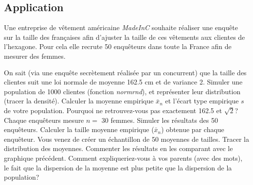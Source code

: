 \documentclass[12pt,paper=a4,answers]{exam}
\begin{document}
\subsection*{Application}
Une entreprise de v\^etement am\'ericaine \textit{MadeInC} souhaite r\'ealiser une enqu\^ete sur la taille des fran\c caises afin d'ajuster la taille de ces v\^etements aux clientes de l'hexagone. Pour cela elle recrute 50 enqu\^eteurs dans toute la France afin de mesurer des femmes. 
\begin{questions}  
	\setcounter{question}{2}
    \question On sait (via une enqu\^ete secr\`etement r\'ealis\'ee par un concurrent) que la taille des clientes suit une loi normale de moyenne 162.5 cm et de variance 2. Simuler  une population de 1000 clientes (fonction \textit{normrnd}), et repr\'esenter leur distribution (tracer la densité). Calculer la moyenne empirique $\bar{x}_n$ et l'\'ecart type empirique $s$ de votre population. Pourquoi ne retrouvez-vous pas exactement 162.5 et $\sqrt{2}$?
    \question Chaque enqu\^eteurs mesure $n =$ 30 femmes. Simuler les r\'esultats des 50 enqu\^eteurs. Calculer la taille moyenne empirique ($\bar{x}_n$) obtenue par chaque enqu\^eteur. Vous venez de cr\'eer un \'echantillon de 50 moyennes de tailles.%
    \question Tracer la distribution des moyennes. Commenter les r\'esultats en les comparant avec le graphique précédent.
    \question Comment expliqueriez-vous \`a vos parents (avec des mots), le fait que la dispersion de la moyenne est plus petite que la dispersion de la population?  


\end{questions}
\end{document}
